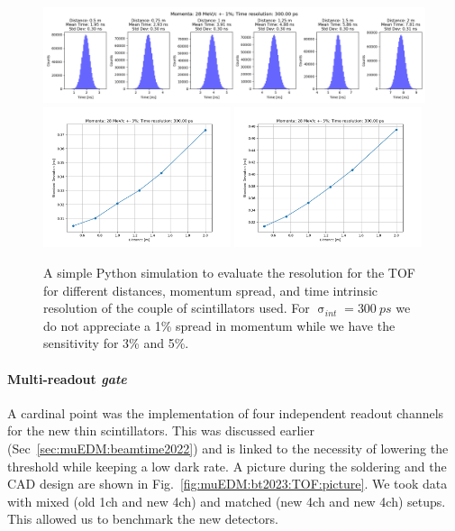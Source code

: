 \begin{refsection}
        \begin{figure}
            \centering
            \includegraphics[width=\textwidth]{Figures/muEDM_Dec2023/histo_28_1_300.png}\\
            \includegraphics[width=0.49\textwidth]{Figures/muEDM_Dec2023/trend_28_3_300.00.png}
            \hfill
            \includegraphics[width=0.49\textwidth]{Figures/muEDM_Dec2023/trend_28_5_300.00.png}
            \caption[muEDM 2023: TOF momentum spread.]{A simple Python simulation to evaluate the resolution for the TOF for different distances, momentum spread, and time intrinsic resolution of the couple of scintillators used. For $\upsigma_{int}=\SI{300}{ps}$ we do not appreciate a 1\% spread in momentum while we have the sensitivity for 3\% and 5\%.}
            \label{fig:muEDM:bt2023:TOFPython}
        \end{figure}

        \paragraph{Multi-readout \textit{gate}}
        A cardinal point was the implementation of four independent readout channels for the new thin scintillators. 
        This was discussed earlier (Sec~\ref{sec:muEDM:beamtime2022}) and is linked to the necessity of lowering the threshold while keeping a low dark rate.
        A picture during the soldering and the CAD design are shown in Fig.~\ref{fig:muEDM:bt2023:TOF:picture}.
        We took data with mixed (old 1ch and new 4ch) and matched (new 4ch and new 4ch) setups.
        This allowed us to benchmark the new detectors.
        

\end{refsection}
